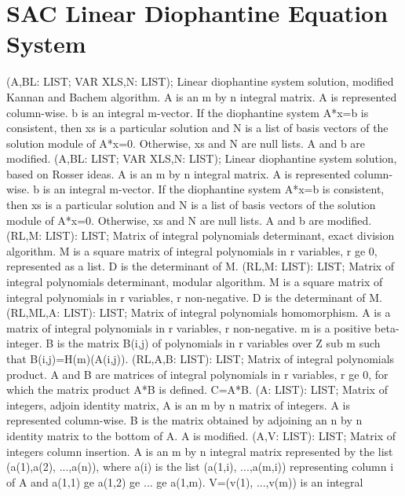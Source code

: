 \section{ SAC Linear Diophantine Equation System  } 
 (A,BL: LIST; VAR XLS,N: LIST); \eproc
\bcom Linear diophantine system solution, modified Kannan and Bachem algorithm.
A is an m by n integral matrix.  A is represented
column-wise.  b is an integral m-vector.  If the diophantine
system A*x=b is consistent, then xs is a particular
solution and N is a list of basis vectors of the solution
module of A*x=0.  Otherwise, xs and N are null lists.  A and b are
modified. \ecom 
{} (A,BL: LIST; VAR XLS,N: LIST); \eproc
\bcom Linear diophantine system solution, based on Rosser ideas. A is an
m by n integral matrix.  A is represented column-wise.  b is
an integral m-vector.  If the diophantine system A*x=b
is consistent, then xs is a particular solution and N is
a list of basis vectors of the solution module of A*x=0.  Otherwise,
xs and N are null lists. A and b are modified. \ecom 
{} (RL,M: LIST): LIST; \eproc
\bcom Matrix of integral polynomials determinant, exact division algorithm.
M is a square matrix of integral polynomials in r variables, r ge 0,
represented as a list. D is the determinant of M. \ecom 
{} (RL,M: LIST): LIST; \eproc
\bcom Matrix of integral polynomials determinant, modular algorithm. M is
a square matrix of integral polynomials in r variables, r non-negative.
D is the determinant of M. \ecom 
{} (RL,ML,A: LIST): LIST; \eproc
\bcom Matrix of integral polynomials homomorphism. A is a matrix of
integral polynomials in r variables, r non-negative.  m is a
positive beta-integer.  B is the matrix B(i,j) of polynomials in r
variables over Z sub m such that B(i,j)=H(m)(A(i,j)). \ecom 
{} (RL,A,B: LIST): LIST; \eproc
\bcom Matrix of integral polynomials product. A and B are matrices of
integral polynomials in r variables, r ge 0, for which the matrix
product A*B is defined. C=A*B. \ecom 
{} (A: LIST): LIST; \eproc
\bcom Matrix of integers, adjoin identity matrix, A is an m by n matrix
of integers.  A is represented column-wise.  B is the matrix obtained
by adjoining an n by n identity matrix to the bottom of A.  A is
modified. \ecom 
{} (A,V: LIST): LIST; \eproc
\bcom Matrix of integers column insertion. A is an m by n integral
matrix represented by the list (a(1),a(2), ...,a(n)), where a(i) is the
list (a(1,i), ...,a(m,i)) representing column i of A and a(1,1)
ge a(1,2) ge  ... ge a(1,m).  V=(v(1), ...,v(m)) is an integral
